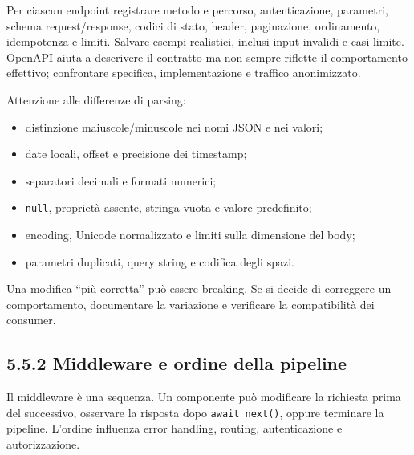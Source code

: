 \documentclass[
  italian,
  10pt,
]{book}
\providecommand{\tightlist}{%
  \setlength{\itemsep}{0pt}\setlength{\parskip}{0pt}}
\begin{document}
Per ciascun endpoint registrare metodo e percorso, autenticazione,
parametri, schema request/response, codici di stato, header,
paginazione, ordinamento, idempotenza e limiti. Salvare esempi
realistici, inclusi input invalidi e casi limite. OpenAPI aiuta a
descrivere il contratto ma non sempre riflette il comportamento
effettivo; confrontare specifica, implementazione e traffico
anonimizzato.

Attenzione alle differenze di parsing:

\begin{itemize}
\tightlist
\item
  distinzione maiuscole/minuscole nei nomi JSON e nei valori;
\item
  date locali, offset e precisione dei timestamp;
\item
  separatori decimali e formati numerici;
\item
  \texttt{null}, proprietà assente, stringa vuota e valore predefinito;
\item
  encoding, Unicode normalizzato e limiti sulla dimensione del body;
\item
  parametri duplicati, query string e codifica degli spazi.
\end{itemize}

Una modifica ``più corretta'' può essere breaking. Se si decide di
correggere un comportamento, documentare la variazione e verificare la
compatibilità dei consumer.

\subsection{5.5.2 Middleware e ordine della
pipeline}\label{middleware-e-ordine-della-pipeline}

Il middleware è una sequenza. Un componente può modificare la richiesta
prima del successivo, osservare la risposta dopo \texttt{await\ next()},
oppure terminare la pipeline. L'ordine influenza error handling,
routing, autenticazione e autorizzazione.
\end{document}
